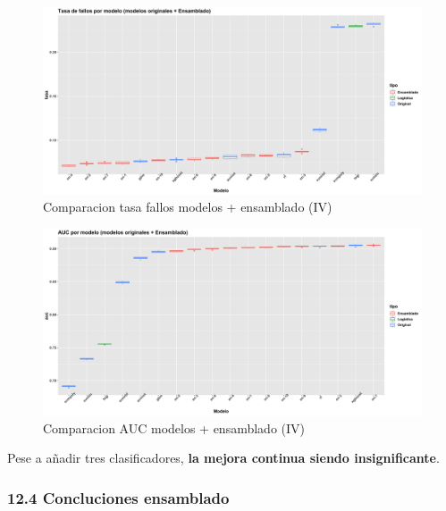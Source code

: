 \documentclass[
]{article}
\begin{document}
\begin{figure}[h!]

{\centering \includegraphics[width=0.99\linewidth,height=0.99\textheight,]{./charts/ensamblado_modelos3} 

}

\caption{Comparacion tasa fallos modelos + ensamblado (IV)}\label{fig:unnamed-chunk-147}
\end{figure}
\begin{figure}[h!]

{\centering \includegraphics[width=0.99\linewidth,height=0.99\textheight,]{./charts/ensamblado_modelos3_auc} 

}

\caption{Comparacion AUC modelos + ensamblado (IV)}\label{fig:unnamed-chunk-148}
\end{figure}

Pese a añadir tres clasificadores, \textbf{la mejora continua siendo
insignificante}.

\hypertarget{concluciones-ensamblado}{%
\subsubsection{12.4 Concluciones
ensamblado}\label{concluciones-ensamblado}}
\end{document}
